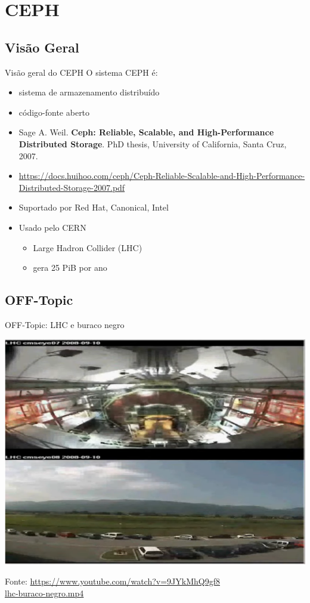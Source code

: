 \documentclass[xcolor=dvipsnames,table]{beamer}
\begin{document}
\section{CEPH}
\subsection{Visão Geral}
\begin{frame}{Visão geral do CEPH}
	O sistema CEPH é:
	\begin{itemize}
		\item sistema de armazenamento distribuído
		\item código-fonte aberto
		\item Sage A. Weil. \textbf{Ceph: Reliable, Scalable, and High-Performance Distributed Storage}. PhD thesis, University of California, Santa Cruz, 2007.
		\item \url{https://docs.huihoo.com/ceph/Ceph-Reliable-Scalable-and-High-Performance-Distributed-Storage-2007.pdf}
		\item Suportado por Red Hat, Canonical, Intel
		\item Usado pelo CERN
		\begin{itemize}
			\item Large Hadron Collider (LHC)
			\item gera 25 PiB por ano
		\end{itemize}				
	\end{itemize}
\end{frame}

\subsection*{OFF-Topic}
\begin{frame}{OFF-Topic: LHC e buraco negro}
	\begin{center}
		\includegraphics[scale=0.25]{buraco-negro-1.png}
	\end{center}
	Fonte: \url{https://www.youtube.com/watch?v=9JYkMhQ9gf8} \\
	\url{lhc-buraco-negro.mp4}
\end{frame}
\end{document}

